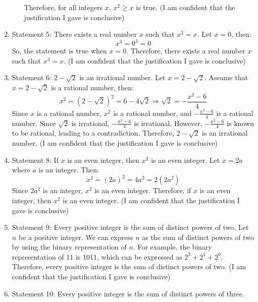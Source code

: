 \documentclass{article}
\begin{document}
\begin{enumerate}
\begin{itemize}
                    Therefore, for all integers \(x\), \(x^2 \geq x\) is true.\newline
                    (I am confident that the justification I gave is conclusive)
          \end{itemize}
    \item Statement 5: There exists a real number $x$ such that $x^3 = x$.\newline
          Let \(x = 0\), then:
          \[
              x^3 = 0^3 = 0
          \]
          So, the statement is true when \(x = 0\).\newline
          Therefore, there exists a real number \(x\) such that \(x^3 = x\).\newline
          (I am confident that the justification I gave is conclusive)
    \item Statement 6: $2 - \sqrt{2}$ is an irrational number.\newline
          Let \(x = 2 - \sqrt{2}\). Assume that \(x = 2 - \sqrt{2}\) is a rational number, then:
          \[
              x^2 = {{(2 - \sqrt{2})}^2} = 6 - 4\sqrt{2} \Rightarrow \sqrt{2} = -\frac{x^2-6}{4}
          \]
          Since \(x\) is a rational number, \(x^2\) is a rational number, and \(-\frac{x^2-6}{4}\) is a rational number.\newline
          Since \(\sqrt{2}\) is irrational, \(-\frac{x^2-6}{4}\) is irrational. However, \(-\frac{x^2-6}{4}\) is known to be rational,
          leading to a contradiction.\newline
          Therefore, \(2 - \sqrt{2}\) is an irrational number.\newline
          (I am confident that the justification I gave is conclusive)
    \item Statement 8: If $x$ is an even integer, then $x^2$ is an even integer.\newline
          Let \(x = 2a\) where \(a\) is an integer. Then:
          \[
              x^2 = (2a)^2 = 4a^2 = 2(2a^2)
          \]
          Since \(2a^2\) is an integer, \(x^2\) is an even integer.\newline
          Therefore, if \(x\) is an even integer, then \(x^2\) is an even integer.\newline
          (I am confident that the justification I gave is conclusive)
    \item Statement 9: Every positive integer is the sum of distinct powers of two.\newline
          Let \(n\) be a positive integer. We can express \(n\) as the sum of distinct powers of two by using the binary representation of \(n\).
          For example, the binary representation of 11 is 1011, which can be expressed as \(2^3 + 2^1 + 2^0\).\newline
          Therefore, every positive integer is the sum of distinct powers of two.\newline
          (I am confident that the justification I gave is conclusive)
    \item Statement 10: Every positive integer is the sum of distinct powers of three.\newline

\end{enumerate}
\end{document}
